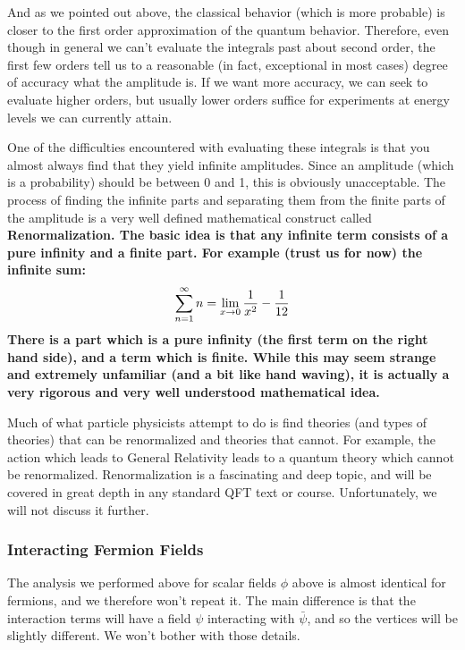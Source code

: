 \documentclass[12pt,epsf]{article}
\def\nolabel{\nonumber }
\def\nolabel{\nonumber }
\begin{document}
And as we pointed out above, the classical behavior (which is more
probable) is closer to the first order approximation of the quantum
behavior.  Therefore, even though in general we can't evaluate the
integrals past about second order, the first few orders tell us to a
reasonable (in fact, exceptional in most cases) degree of accuracy what
the amplitude is.  If we want more accuracy, we can seek to evaluate
higher orders, but usually lower orders suffice for experiments at
energy levels we can currently attain.	

One of the difficulties encountered with evaluating these integrals is
that you almost always find that they yield infinite amplitudes.  Since
an amplitude (which is a probability) should be between 0 and 1,
this is obviously unacceptable.  The process of finding the infinite
parts and separating them from the finite parts of the amplitude is a
very well defined mathematical construct called \bf Renormalization\rm.
 The basic idea is that any infinite term consists of a pure infinity
and a finite part.  For example (trust us for now) the infinite sum:
\begin{eqnarray}
\sum_{n=1}^{\infty} n = \lim_{x\rightarrow 0} {1\over x^2} - {1\over
12}\nolabel
\end{eqnarray}
There is a part which is a pure infinity (the first term on the right
hand side), and a term which is finite.  While this may seem strange
and extremely unfamiliar (and a bit like hand waving), it is actually a
very rigorous and very well understood mathematical idea.  

Much of what particle physicists attempt to do is find theories (and
types of theories) that can be renormalized and theories that cannot.  For
example, the action which leads to General Relativity leads to a
quantum theory which cannot be renormalized.  Renormalization is a
fascinating and deep topic, and will be covered in great depth in any
standard QFT text or course.	Unfortunately, we will not discuss it
further.  

\subsubsection{Interacting Fermion Fields}

The analysis we performed above for scalar fields $\phi$ above is
almost identical for fermions, and we therefore won't repeat it.  The
main difference is that the interaction terms will have a field $\psi$
interacting with $\bar \psi$, and so the vertices will be slightly
different.  We won't bother with those details.  
\end{document}
